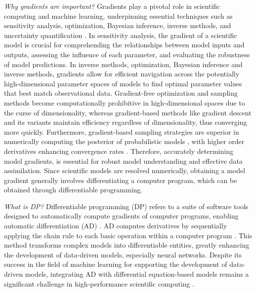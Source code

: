 \textit{Why gradients are important?}
Gradients play a pivotal role in scientific computing and machine learning, underpinning essential techniques such as sensitivity analysis, optimization, Bayesian inference, inverse methods, and uncertainty quantification \cite{Razavi.2021}.
In sensitivity analysis, the gradient of a scientific model is crucial for comprehending the relationships between model inputs and outputs, assessing the influence of each parameter, and evaluating the robustness of model predictions. 
In inverse methods, optimization, Bayesian inference and inverse methods, gradients allow for efficient navigation across the potentially high-dimensional parameter spaces of models to find optimal parameter values that best match observational data. 
Gradient-free optimization and sampling methods become computationally prohibitive in high-dimensional spaces due to the curse of dimensionality, whereas gradient-based methods like gradient descent and its variants \cite{ruder2016overview-gradient-descent} maintain efficiency regardless of dimensionality, thus converging more quickly. 
Furthermore, gradient-based sampling strategies are superior in numerically computing the posterior of probabilistic models \cite{neal2011mcmc}, with higher order derivatives enhancing convergence rates \cite{BuiThanh:2012ul}. 
Therefore, accurately determining model gradients, is essential for robust model understanding and effective data assimilation. 
Since scientific models are resolved numerically, obtaining a model gradient generally involves differentiating a computer program, which can be obtained through differentiable programming.

\textit{What is DP?}
Differentiable programming (DP) refers to a suite of software tools designed to automatically compute gradients of computer programs, enabling automatic differentiation (AD) \cite{Innes_Zygote}. 
AD computes derivatives by sequentially applying the chain rule to each basic operation within a computer program \cite{Griewank:2008kh, Naumann.2011}.
This method transforms complex models into differentiable entities, greatly enhancing the development of data-driven models, especially neural networks. 
Despite its success in the field of machine learning for supporting the development of data-driven models, integrating AD with differential equation-based models remains a significant challenge in high-performance scientific computing \cite{Naumann.2011}.

